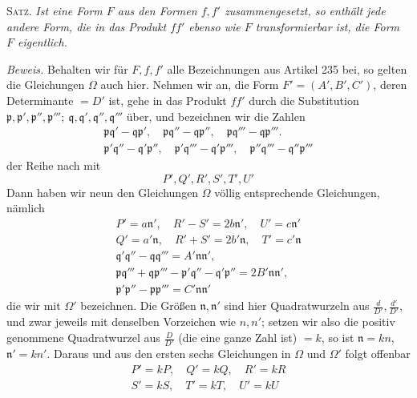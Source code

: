 \textsc{Satz.} \textit{Ist eine Form $F$ aus den Formen $f,f'$ zusammengesetzt, so enthält jede andere Form, die in das Produkt $ff'$ ebenso wie $F$ transformierbar ist, die Form $F$ eigentlich.}

\textit{Beweis.} Behalten wir für $F,f,f'$ alle Bezeichnungen aus Artikel 235 bei, so gelten die Gleichungen $\Omega$ auch hier. Nehmen wir an, die Form $F'=(A',B',C')$, deren Determinante $=D'$ ist, gehe in das Produkt $ff'$ durch die Substitution $\mathfrak{p},\mathfrak{p}',\mathfrak{p}'',\mathfrak{p}''';\ \mathfrak{q},\mathfrak{q}',\mathfrak{q}'',\mathfrak{q}'''$ über, und bezeichnen wir die Zahlen
\[
\begin{gathered}\mathfrak{p}\mathfrak{q}'-\mathfrak{q}\mathfrak{p}',\quad
\mathfrak{p}\mathfrak{q}''-\mathfrak{q}\mathfrak{p}'',\quad
\mathfrak{p}\mathfrak{q}'''-\mathfrak{q}\mathfrak{p}'''.\\
\mathfrak{p}'\mathfrak{q}''-\mathfrak{q}'\mathfrak{p}'',\quad
\mathfrak{p}'\mathfrak{q}'''-\mathfrak{q}'\mathfrak{p}''',\quad
\mathfrak{p}''\mathfrak{q}'''-\mathfrak{q}''\mathfrak{p}'''\end{gathered}
\]
der Reihe nach mit
\[
P',Q',R',S',T',U'
\]
Dann haben wir neun den Gleichungen $\Omega$ völlig entsprechende Gleichungen, nämlich
\[
\begin{gathered}
P'=a\mathfrak{n}',\quad R'-S'=2b\mathfrak{n}',\quad U'=c\mathfrak{n}'\\
Q'=a'\mathfrak{n},\quad R'+S'=2b'\mathfrak{n},\quad T'=c'\mathfrak{n}\\
\mathfrak{q}'\mathfrak{q}''-\mathfrak{q}\mathfrak{q}'''=A'\mathfrak{n}\mathfrak{n}',\\
\mathfrak{p}\mathfrak{q}'''+\mathfrak{q}\mathfrak{p}'''-\mathfrak{p}'\mathfrak{q}''-\mathfrak{q}'\mathfrak{p}''=2B'\mathfrak{n}\mathfrak{n}',\\
\mathfrak{p}'\mathfrak{p}''-\mathfrak{p}\mathfrak{p}'''=C'\mathfrak{n}\mathfrak{n}'
\end{gathered}
\]
die wir mit $\Omega'$ bezeichnen. Die Größen $\mathfrak{n},\mathfrak{n}'$ sind hier Quadratwurzeln aus $\frac{d}{D'},\frac{d'}{D'}$, und zwar jeweils mit denselben Vorzeichen wie $n,n'$; setzen wir also die positiv genommene Quadratwurzel aus $\frac{D}{D'}$ (die eine ganze Zahl ist) $=k$, so ist $\mathfrak{n}=kn$, $\mathfrak{n}'=kn'$. Daraus und aus den ersten sechs Gleichungen in $\Omega$ und $\Omega'$ folgt offenbar
\[
\begin{gathered}
P'=kP,\quad Q'=kQ,\quad R'=kR\\
S'=kS,\quad T'=kT,\quad U'=kU
\end{gathered}
\]
